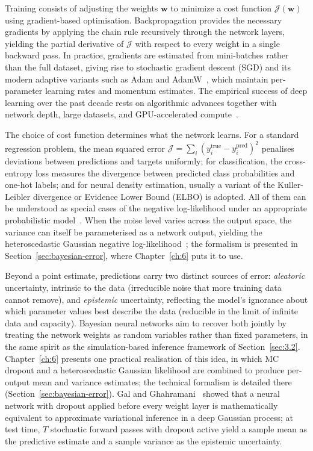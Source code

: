 Training consists of adjusting the weights $\boldsymbol{w}$ to minimize a cost function $\mathcal{J}(\boldsymbol{w})$ using gradient-based optimisation.
Backpropagation provides the necessary gradients by applying the chain rule recursively through the network layers, yielding the partial derivative of $\mathcal{J}$ with respect to every weight in a single backward pass.
In practice, gradients are estimated from mini-batches rather than the full dataset, giving rise to stochastic gradient descent (SGD) and its modern adaptive variants such as Adam and AdamW~\cite{Loshchilov:2017bsp}, which maintain per-parameter learning rates and momentum estimates.
The empirical success of deep learning over the past decade rests on algorithmic advances together with network depth, large datasets, and GPU-accelerated compute~\cite{LeCun:2015pmr}.

The choice of cost function determines what the network learns.
For a standard regression problem, the mean squared error $\mathcal{J} = \sum_i (y_i^\mathrm{true} - y_i^\mathrm{pred})^2$ penalises deviations between predictions and targets uniformly; for classification, the cross-entropy loss measures the divergence between predicted class probabilities and one-hot labels; and for neural density estimation, usually a variant of the Kuller-Leibler divergence or Evidence Lower Bound (ELBO) is adopted. 
All of them can be understood as special cases of the negative log-likelihood under an appropriate probabilistic model~\cite{bishop,Murphy:2022pml}.
When the noise level varies across the output space, the variance can itself be parameterised as a network output, yielding the heteroscedastic Gaussian negative log-likelihood~\cite{heteroscedastic-error}; the formalism is presented in Section~\ref{sec:bayesian-error}, where Chapter~\ref{ch:6} puts it to use.

Beyond a point estimate, predictions carry two distinct sources of error: \textit{aleatoric} uncertainty, intrinsic to the data (irreducible noise that more training data cannot remove), and \textit{epistemic} uncertainty, reflecting the model's ignorance about which parameter values best describe the data (reducible in the limit of infinite data and capacity).
Bayesian neural networks aim to recover both jointly by treating the network weights as random variables rather than fixed parameters, in the same spirit as the simulation-based inference framework of Section~\ref{sec:3.2}.
Chapter~\ref{ch:6} presents one practical realisation of this idea, in which MC dropout and a heteroscedastic Gaussian likelihood are combined to produce per-output mean and variance estimates; the technical formalism is detailed there (Section~\ref{sec:bayesian-error}).
Gal and Ghahramani~\cite{mcdropout} showed that a neural network with dropout applied before every weight layer is mathematically equivalent to approximate variational inference in a deep Gaussian process; at test time, $T$ stochastic forward passes with dropout active yield a sample mean as the predictive estimate and a sample variance as the epistemic uncertainty.

